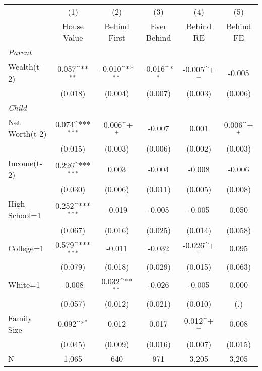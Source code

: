 {
\def\sym#1{\ifmmode^{#1}\else\(^{#1}\)\fi}
\begin{tabular}{l*{5}{c}}
\toprule
                &\multicolumn{1}{c}{(1)}&\multicolumn{1}{c}{(2)}&\multicolumn{1}{c}{(3)}&\multicolumn{1}{c}{(4)}&\multicolumn{1}{c}{(5)}\\
                &\multicolumn{1}{c}{House Value}&\multicolumn{1}{c}{Behind First}&\multicolumn{1}{c}{Ever Behind}&\multicolumn{1}{c}{Behind RE}&\multicolumn{1}{c}{Behind FE}\\
\midrule
\textit{Parent} &                  &                  &                  &                  &                  \\
\;Wealth(t-2)   &    0.057\sym{**} &   -0.010\sym{**} &   -0.016\sym{*}  &   -0.005\sym{+}  &   -0.005         \\
                &  (0.018)         &  (0.004)         &  (0.007)         &  (0.003)         &  (0.006)         \\
\textit{Child}  &                  &                  &                  &                  &                  \\
\;Net Worth(t-2)&    0.074\sym{***}&   -0.006\sym{+}  &   -0.007         &    0.001         &    0.006\sym{+}  \\
                &  (0.015)         &  (0.003)         &  (0.006)         &  (0.002)         &  (0.003)         \\
\;Income(t-2)   &    0.226\sym{***}&    0.003         &   -0.004         &   -0.008         &   -0.006         \\
                &  (0.030)         &  (0.006)         &  (0.011)         &  (0.005)         &  (0.008)         \\
\;High School=1 &    0.252\sym{***}&   -0.019         &   -0.005         &   -0.005         &    0.050         \\
                &  (0.067)         &  (0.016)         &  (0.025)         &  (0.014)         &  (0.058)         \\
\;College=1     &    0.579\sym{***}&   -0.011         &   -0.032         &   -0.026\sym{+}  &    0.095         \\
                &  (0.079)         &  (0.018)         &  (0.029)         &  (0.015)         &  (0.063)         \\
\;White=1       &   -0.008         &    0.032\sym{**} &   -0.026         &   -0.005         &    0.000         \\
                &  (0.057)         &  (0.012)         &  (0.021)         &  (0.010)         &      (.)         \\
\;Family Size   &    0.092\sym{*}  &    0.012         &    0.017         &    0.012\sym{+}  &    0.008         \\
                &  (0.045)         &  (0.009)         &  (0.016)         &  (0.007)         &  (0.015)         \\
\midrule
N               &    1,065         &      640         &      971         &    3,205         &    3,205         \\
\bottomrule
\end{tabular}
}
